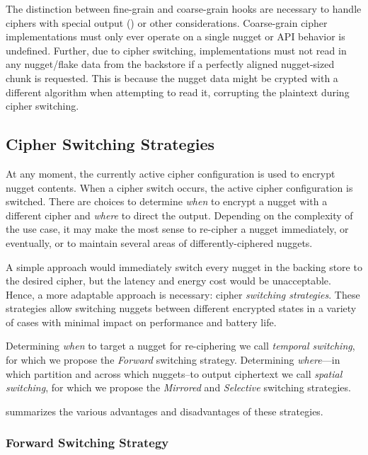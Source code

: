 The distinction between fine-grain and coarse-grain hooks are necessary to
handle ciphers with special output () or other considerations. Coarse-grain cipher
implementations must only ever operate on a single nugget or API behavior is
undefined. Further, due to cipher switching, implementations must not read in
any nugget/flake data from the backstore if a perfectly aligned nugget-sized
chunk is requested. This is because the nugget data might be crypted with a
different algorithm when attempting to read it, corrupting the plaintext during
cipher switching.

\subsection{Cipher Switching Strategies}

At any moment, the currently active cipher configuration is used to encrypt
nugget contents. When a cipher switch occurs, the active cipher configuration is
switched. There are choices to determine \emph{when} to encrypt a nugget with a
different cipher and \emph{where} to direct the output. Depending on the
complexity of the use case, it may make the most sense to re-cipher a nugget
immediately, or eventually, or to maintain several areas of differently-ciphered
nuggets.

A simple approach would immediately switch every nugget in the backing store to
the desired cipher, but the latency and energy cost would be unacceptable.
Hence, a more adaptable approach is necessary: cipher \emph{switching
strategies}. These strategies allow switching nuggets between different
encrypted states in a variety of cases with minimal impact on performance and
battery life.

Determining \emph{when} to target a nugget for re-ciphering we call
\emph{temporal switching}, for which we propose the \emph{Forward} switching
strategy. Determining \emph{where}---in which partition and across which
nuggets--to output ciphertext we call \emph{spatial switching}, for which we
propose the \emph{Mirrored} and \emph{Selective} switching strategies.

 summarizes the various advantages and
disadvantages of these strategies.

\subsubsection{Forward Switching Strategy}

